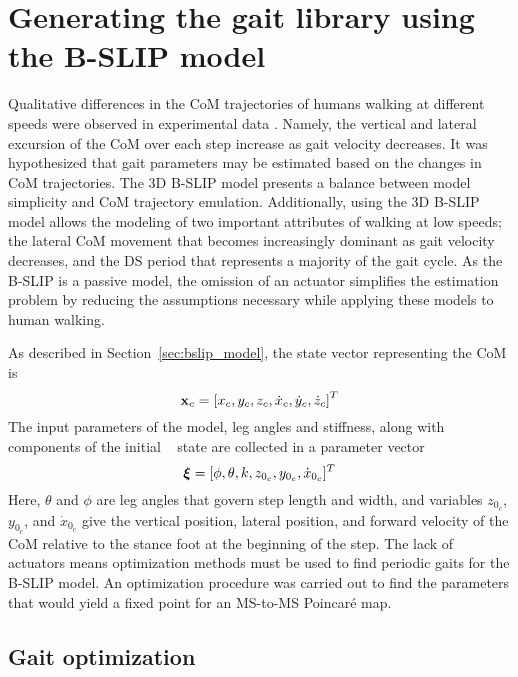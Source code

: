 \section{Generating the gait library using the B-SLIP model} \label{sec:gait_opt}

Qualitative differences in the CoM trajectories of humans walking at different speeds were observed in experimental data \cite{fukuchi2018public}. Namely, the vertical and lateral excursion of the CoM over each step increase as gait velocity decreases. It was hypothesized that gait parameters may be estimated based on the changes in CoM trajectories. The 3D B-SLIP model presents a balance between model simplicity and CoM trajectory emulation. Additionally, using the 3D B-SLIP model allows the modeling of two important attributes of walking at low speeds; the lateral CoM movement that becomes increasingly dominant as gait velocity decreases, and the DS period that represents a majority of the gait cycle. As the B-SLIP is a passive model, the omission of an actuator simplifies the estimation problem by reducing the assumptions necessary while applying these models to human walking. 

As described in Section~\ref{sec:bslip_model}, the state vector representing the CoM is \[\mathbf{x}_{c} = \left[x_{c} ,y_{c} ,z_{c} ,\dot{x}_{c} ,\dot{y}_{c} ,\dot{z}_{c}\right]^T \] The input parameters of the model, leg angles and stiffness, along with components of the initial \com~ state are collected in a parameter vector \[\boldsymbol{\xi} = [\phi, \theta ,k ,z_{0_{c}} ,y_{0_{c}} ,\dot{x}_{0_{c}}]^T\] Here, $ \theta $ and $ \phi $ are leg angles that govern step length and width, and variables $ z_{0_{c}}$, $y_{0_{c}}$, and $\dot{x}_{0_{c}} $ give the vertical position, lateral position, and forward velocity of the CoM relative to the stance foot at the beginning of the step. The lack of actuators means optimization methods must be used to find periodic gaits for the B-SLIP model. An optimization procedure was carried out to find the parameters that would yield a fixed point for an MS-to-MS Poincar\'e map.

\subsection{Gait optimization}
%	

